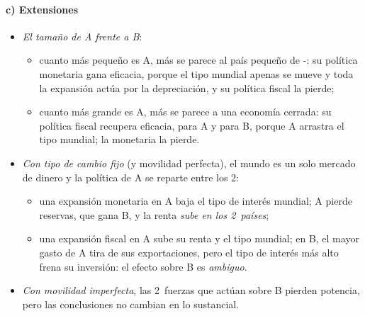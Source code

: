 \documentclass[11pt]{article}
\begin{document}
\paragraph{c) Extensiones}
\begin{itemize}
\item \emph{El tamaño de A frente a B}:
  \begin{itemize}
  \item cuanto más pequeño es A, más se parece al país pequeño de -: su política monetaria gana eficacia, porque el tipo mundial apenas se mueve y toda la expansión actúa por la depreciación, y su política fiscal la pierde;
  \item cuanto más grande es A, más se parece a una economía cerrada: su política fiscal recupera eficacia, para A y para B, porque A arrastra el tipo mundial; la monetaria la pierde.
  \end{itemize}
\item \emph{Con tipo de cambio fijo} (y movilidad perfecta), el mundo es un solo mercado de dinero y la política de A se reparte entre los 2:
  \begin{itemize}
  \item una expansión monetaria en A baja el tipo de interés mundial; A pierde reservas, que gana B, y la renta \emph{sube en los 2~países};
  \item una expansión fiscal en A sube su renta y el tipo mundial; en B, el mayor gasto de A tira de sus exportaciones, pero el tipo de interés más alto frena su inversión: el efecto sobre B es \emph{ambiguo}.
  \end{itemize}
\item \emph{Con movilidad imperfecta}, las 2~fuerzas que actúan sobre B pierden potencia, pero las conclusiones no cambian en lo sustancial.
\end{itemize}
\end{document}
